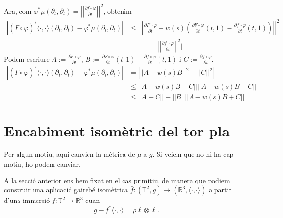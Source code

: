 {Ara, com $\varphi^*\mu(\partial_t,\partial_t) = \left|\left| \frac{\partial f\circ\varphi}{\partial t} \right|\right|^2$, obtenim
\begin{align*}
    |(\bar F\circ\varphi)^*\langle\cdot,\cdot\rangle(\partial_t, \partial_t) - \varphi^*\mu(\partial_t, \partial_t)| &\le 
    \Bigg|\left|\left|\frac{\partial F\circ\varphi}{\partial t}-w(s)\left(\frac{\partial F\circ\varphi}{\partial t}(t,1) - \frac{\partial f\circ\varphi}{\partial t}(t,1)\right)\right|\right|^2 \\&\quad\quad\quad- \left|\left| \frac{\partial f\circ\varphi}{\partial t} \right|\right|^2\Bigg|
\end{align*}
Podem escriure $A:=\frac{\partial F\circ\varphi}{\partial t}$, $B:=\frac{\partial F\circ \varphi}{\partial t}(t,1) - \frac{\partial f\circ\varphi}{\partial t}(t,1)$ i $C:=\frac{\partial f\circ\varphi}{\partial t}$.
\begin{align*}
    |(\bar F\circ\varphi)^*\langle\cdot,\cdot\rangle(\partial_t, \partial_t) - \varphi^*\mu(\partial_t, \partial_t)| 
    &=
    \left|\left|\left|A-w(s)B\right|\right|^2 - \left|\left|C\right|\right|^2\right|
    \\&\le
    \left|\left|A-w(s)B - C\right|\right|\left|\left|A-w(s)B + C\right|\right|
    \\&\le
    \left|\left|A - C\right|\right| + \left|\left|B\right|\right| \left|\left|A-w(s)B + C\right|\right|
\end{align*}









}









\section{Encabiment isomètric del tor pla}
{
\color{blue} Per algun motiu, aquí canvien la mètrica de $\mu$ a $g$. Si veiem que no hi ha cap motiu, ho podem canviar.
}

A la secció anterior ens hem fixat en el cas primitiu, de manera que podiem construir una aplicació gairebé isomètrica $\bar f:(\mathbb T^2, g)\to(\mathbb R^3, \langle\cdot, \cdot\rangle)$ a partir d'una immersió $f:\mathbb T^2\to\mathbb R^3$ quan
\begin{equation*}
    g - f^*\langle\cdot, \cdot\rangle = \rho\ell\otimes\ell.
\end{equation*}

